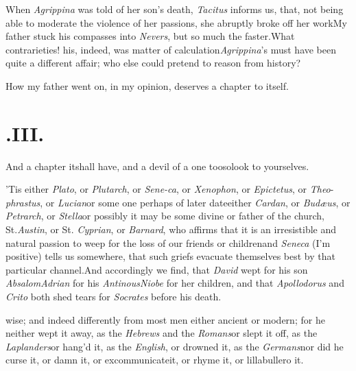 \documentclass{article}
\begin{document}
When \textit{Agrippina} was told of her son’s death,
\textit{Tacitus} informs us, that, not being able to moderate the
violence of her passions, she abruptly broke off her
work\break\tsk My
father stuck his compasses into \textit{Nevers}, but so much the
faster.\tsk What contrarieties! his, indeed, was matter of
calculation\tsk \textit{Agrippina}’s must have been quite a
different affair; who else could pretend to reason from
history?

How my father went on, in my opi\-nion, deserves a chapter to
itself.\tsk

\section{.\enspace  III.}

\setlength{\baselineskip}{12.25pt}  %

\quad \tsh \quad \tsh \quad And a chapter it\break shall
have, and a devil of a one too\tsk so\break look to yourselves.

’Tis either \textit{Plato}, or \textit{Plutarch}, or
\textit{Sene-\break ca}, or \textit{Xenophon}, or \textit{Epictetus}, or
\textit{Theo}- \textit{phrastus}, or \textit{Lucian}\tsk or some one perhaps of
later date\tsk either \textit{Cardan}, or \textit{Bu\-dæus}, or
\textit{Petrarch}, or \textit{Stella}\tsk or possibly it may be some
divine or father of the church, St.\@ \textit{Austin}, or St.\@
\textit{Cyprian}, or \textit{Barnard}, who affirms that it is an
irresistible and natural passion to weep for the loss of our
friends or children\tsk and \textit{Seneca} (I’m positive)
tells us somewhere, that such griefs evacuate themselves best by
that particular channel.\tsk And accord\-ingly we find, that
\textit{David} wept for his son \textit{Absalom}\tsk \textit{Adrian}
for his \textit{Antinous}\tsk\break \textit{Niobe} for her children, and
that \textit{Apollo\-dorus} and \textit{Crito} both shed tears for
\textit{Socra\-tes} before his death.

\-wise; and indeed
differently from most men either ancient or modern; for he neither
wept it away, as the \textit{Hebrews} and the \textit{Romans}\tsk or
slept it off, as the \textit{Laplanders}\tsk or hang’d it, as the
\textit{English}, or drowned it, as the \textit{Germans}\tsk nor did
he curse it, or damn it, or
excommunicate\break it, or rhyme it, or
lillabullero it.\tsh
\end{document}
